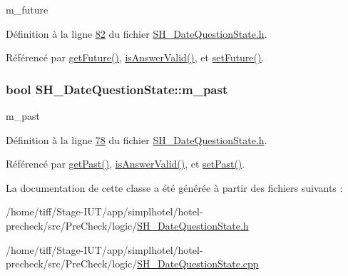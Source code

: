 m\-\_\-future 



Définition à la ligne \hyperlink{SH__DateQuestionState_8h_source_l00082}{82} du fichier \hyperlink{SH__DateQuestionState_8h_source}{S\-H\-\_\-\-Date\-Question\-State.\-h}.



Référencé par \hyperlink{classSH__DateQuestionState_aa7b73f952558aa2aefaec2b94119abbc}{get\-Future()}, \hyperlink{classSH__DateQuestionState_a303e9f86c37ded79fb3ad4d31d183c21}{is\-Answer\-Valid()}, et \hyperlink{classSH__DateQuestionState_acda6fa1cdc24ad7c5c012d88c948b819}{set\-Future()}.

\hypertarget{classSH__DateQuestionState_afa33fd208cf539167bcc26c83e57d803}{
\subsubsection[{m\-\_\-past}]{\setlength{\rightskip}{0pt plus 5cm}bool S\-H\-\_\-\-Date\-Question\-State\-::m\-\_\-past\hspace{0.3cm}{\ttfamily [private]}}}\label{classSH__DateQuestionState_afa33fd208cf539167bcc26c83e57d803}


m\-\_\-past 



Définition à la ligne \hyperlink{SH__DateQuestionState_8h_source_l00078}{78} du fichier \hyperlink{SH__DateQuestionState_8h_source}{S\-H\-\_\-\-Date\-Question\-State.\-h}.



Référencé par \hyperlink{classSH__DateQuestionState_a409a85ad6b7d2e37cfc42c3cfdca12ad}{get\-Past()}, \hyperlink{classSH__DateQuestionState_a303e9f86c37ded79fb3ad4d31d183c21}{is\-Answer\-Valid()}, et \hyperlink{classSH__DateQuestionState_a6f376c24355deb573b3132d18cf50341}{set\-Past()}.



La documentation de cette classe a été générée à partir des fichiers suivants \-:\begin{DoxyCompactItemize}
\item 
/home/tiff/\-Stage-\/\-I\-U\-T/app/simplhotel/hotel-\/precheck/src/\-Pre\-Check/logic/\hyperlink{SH__DateQuestionState_8h}{S\-H\-\_\-\-Date\-Question\-State.\-h}\item 
/home/tiff/\-Stage-\/\-I\-U\-T/app/simplhotel/hotel-\/precheck/src/\-Pre\-Check/logic/\hyperlink{SH__DateQuestionState_8cpp}{S\-H\-\_\-\-Date\-Question\-State.\-cpp}\end{DoxyCompactItemize}
